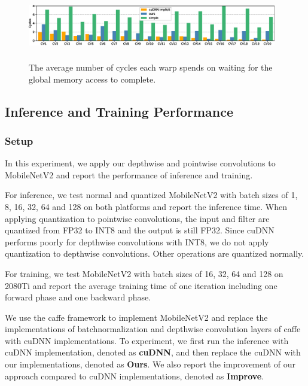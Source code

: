 \begin{figure}
    \centering
    \includegraphics[width=0.97\textwidth,height=3cm]{./figure/longscore.eps}
    \caption{The average number of cycles each warp spends on waiting for the global memory access to complete.}
    \label{fig:stalllongscore}
\end{figure}

\subsection{Inference and Training Performance}
\label{sec:inferexp}
\subsubsection{Setup} 
In this experiment, we apply our depthwise and pointwise convolutions to MobileNetV2 and report the performance of inference and training. 

For inference, we test normal and quantized MobileNetV2 with batch sizes of 1, 8, 16, 32, 64 and 128 on both platforms and report the inference time. 
When applying quantization to pointwise convolutions, the input and filter are quantized from FP32 to INT8 and the output is still FP32. 
Since cuDNN performs poorly for depthwise convolutions with INT8, we do not apply quantization to  depthwise convolutions.
Other operations are quantized normally.

For training, we test MobileNetV2 with batch sizes of 16, 32, 64 and 128 on 2080Ti and report the average training time of one iteration including one forward phase and one backward phase.

We use the caffe framework to implement MobileNetV2 and replace the implementations of batchnormalization and depthwise convolution layers of caffe with cuDNN implementations. 
To experiment, we first run the inference with cuDNN implementation, denoted as \textbf{cuDNN}, and then replace the cuDNN with our implementations, denoted as \textbf{Ours}.
We also report the improvement of our approach compared to cuDNN implementations, denoted as \textbf{Improve}.

